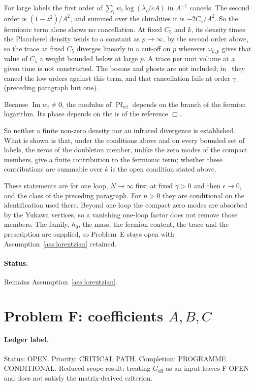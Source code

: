 For large labels the first order of \(\sum_iw_i\log(\lambda_i/cA)\) in \(A^{-1}\) cancels. The second order is \((1-z^2)/A^2\), and summed over the chiralities it is \(-2C_4/A^2\). So the fermionic term alone shows no cancellation. At fixed \(C_5\) and \(k\), its density times the Plancherel density tends to a constant as \(p\to\infty\), by the second order above, so the trace at fixed \(C_5\) diverges linearly in a cut-off on \(p\) wherever \(\omega_{k,p}\) gives that value of \(C_5\) a weight bounded below at large \(p\). A trace per unit volume at a given time is not constructed. The bosons and ghosts are not included; in~\cite{Steinacker2023} they cancel the low orders against this term, and that cancellation fails at order \(\gamma\) (preceding paragraph but one).

Because \(\operatorname{Im}w_i\neq0\), the modulus of \(\operatorname{Pf}_{\mathrm{rel}}\) depends on the branch of the fermion logarithm. Its phase depends on the \(\mathrm i\epsilon\) of the reference \(\Box\).

So neither a finite non-zero density nor an infrared divergence is established. What is shown is that, under the conditions above and on every bounded set of labels, the zeros of the doubleton member, unlike the zero modes of the compact members, give a finite contribution to the fermionic term; whether these contributions are summable over \(k\) is the open condition stated above.

These statements are for one loop, \(N\to\infty\) first at fixed \(\gamma>0\) and then \(\epsilon\to0\), and the class of the preceding paragraph. For \(n>0\) they are conditional on the identification used there. Beyond one loop the compact zero modes are absorbed by the Yukawa vertices, so a vanishing one-loop factor does not remove those members. The family, \(h_0\), the mass, the fermion content, the trace and the prescription are supplied, so Problem~E stays open with Assumption~\ref{ass:lorentzian} retained.

\paragraph{Status.}
Remains Assumption~\ref{ass:lorentzian}.

\section{Problem F: coefficients \(A,B,C\)}
\label{sec:status-F}

\paragraph{Ledger label.}
Status: OPEN. Priority: CRITICAL PATH. Completion:
PROGRAMME CONDITIONAL. Reduced-scope result: treating
\(G_{\mathrm{eff}}\) as an input leaves F OPEN and does not satisfy
the matrix-derived criterion.

